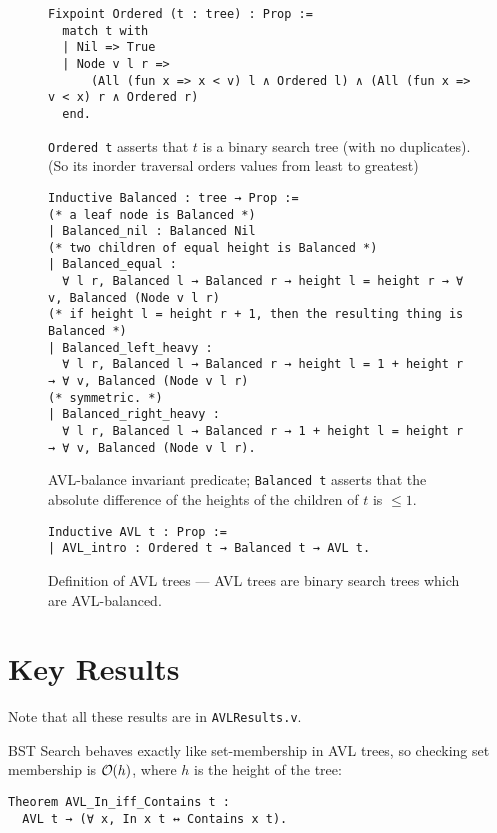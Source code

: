 \documentclass[acmsmall, authorversion, nonacm, overload]{acmart}
\DeclareRobustCommand{\bigO}{%
  \text{\usefont{OMS}{cmsy}{m}{n}O}%
}
\begin{document}
\begin{figure}[h!]
\begin{verbatim}
Fixpoint Ordered (t : tree) : Prop :=
  match t with
  | Nil => True
  | Node v l r =>
      (All (fun x => x < v) l ∧ Ordered l) ∧ (All (fun x => v < x) r ∧ Ordered r)
  end.
\end{verbatim}
  \caption*{\texttt{Ordered t} asserts that $t$ is a binary search tree (with no duplicates).
    (So its inorder traversal orders values from least to greatest)
  }
\end{figure}

\begin{figure}[h!]
\begin{verbatim}
Inductive Balanced : tree → Prop :=
(* a leaf node is Balanced *)
| Balanced_nil : Balanced Nil
(* two children of equal height is Balanced *)
| Balanced_equal :
  ∀ l r, Balanced l → Balanced r → height l = height r → ∀ v, Balanced (Node v l r)
(* if height l = height r + 1, then the resulting thing is Balanced *)
| Balanced_left_heavy :
  ∀ l r, Balanced l → Balanced r → height l = 1 + height r → ∀ v, Balanced (Node v l r)
(* symmetric. *)
| Balanced_right_heavy :
  ∀ l r, Balanced l → Balanced r → 1 + height l = height r → ∀ v, Balanced (Node v l r).
\end{verbatim}
  \caption*{AVL-balance invariant predicate;
    \texttt{Balanced t} asserts that the absolute difference
    of the heights of the children of $t$ is $\le 1$.}
\end{figure}

\begin{figure}[h!]
\begin{verbatim}
Inductive AVL t : Prop :=
| AVL_intro : Ordered t → Balanced t → AVL t.
\end{verbatim}
\caption*{Definition of AVL trees --- AVL trees are binary search trees which are AVL-balanced.}
\end{figure}

\clearpage
\section{Key Results}

Note that all these results are in \verb|AVLResults.v|.

\vspace{1em}
\noindent BST Search behaves exactly like set-membership in AVL trees, so checking set membership is $\bigO(h)$, where
$h$ is the height of the tree:
\begin{verbatim}
Theorem AVL_In_iff_Contains t :
  AVL t → (∀ x, In x t ↔ Contains x t).
\end{verbatim}
\end{document}
